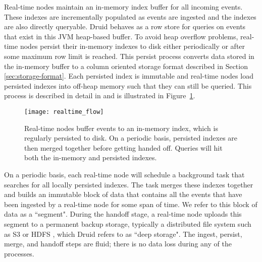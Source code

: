 \documentclass{sig-alternate-2013}
\begin{document}
Real-time nodes maintain an in-memory index buffer for all incoming events.
These indexes are incrementally populated as events are ingested and the
indexes are also directly queryable. Druid behaves as a row store
for queries on events that exist in this JVM heap-based buffer. To avoid heap
overflow problems, real-time nodes persist their in-memory indexes to disk
either periodically or after some maximum row limit is reached. This persist
process converts data stored in the in-memory buffer to a column oriented
storage format described in Section \ref{sec:storage-format}. Each persisted
index is immutable and real-time nodes load persisted indexes into off-heap
memory such that they can still be queried. This process is described in detail
in \cite{o1996log} and is illustrated in Figure~\ref{fig:realtime_flow}.

\begin{figure}
\centering
\texttt{[image: realtime\_flow]}
\caption{Real-time nodes buffer events to an in-memory index, which is
regularly persisted to disk. On a periodic basis, persisted indexes are then merged
together before getting handed off.
Queries will hit both the in-memory and persisted indexes.
}
\label{fig:realtime_flow}
\end{figure}

On a periodic basis, each real-time node will schedule a background task that
searches for all locally persisted indexes. The task merges these indexes
together and builds an immutable block of data that contains all the events
that have been ingested by a real-time node for some span of time. We refer to this
block of data as a ``segment". During the handoff stage, a real-time node
uploads this segment to a permanent backup storage, typically a distributed
file system such as S3 \cite{decandia2007dynamo} or HDFS
\cite{shvachko2010hadoop}, which Druid refers to as ``deep storage". The ingest,
persist, merge, and handoff steps are fluid; there is no data loss during any
of the processes.
\end{document}
